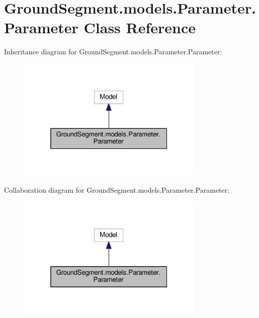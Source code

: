 \hypertarget{class_ground_segment_1_1models_1_1_parameter_1_1_parameter}{}\section{Ground\+Segment.\+models.\+Parameter.\+Parameter Class Reference}
\label{class_ground_segment_1_1models_1_1_parameter_1_1_parameter}


Inheritance diagram for Ground\+Segment.\+models.\+Parameter.\+Parameter\+:\nopagebreak
\begin{figure}[H]
\begin{center}
\leavevmode
\includegraphics[width=253pt]{class_ground_segment_1_1models_1_1_parameter_1_1_parameter__inherit__graph}
\end{center}
\end{figure}


Collaboration diagram for Ground\+Segment.\+models.\+Parameter.\+Parameter\+:\nopagebreak
\begin{figure}[H]
\begin{center}
\leavevmode
\includegraphics[width=253pt]{class_ground_segment_1_1models_1_1_parameter_1_1_parameter__coll__graph}
\end{center}
\end{figure}
